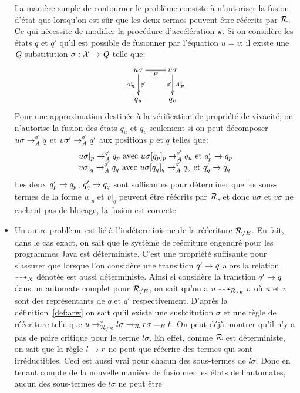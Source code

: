 \begin{itemize}
  La manière simple de contourner le problème consiste à n'autoriser la fusion d'état que lorsqu'on est
  sûr que les deux termes peuvent être réécrits par $\mathcal R$. Ce qui nécessite de modifier la procédure d'accélération
  $\mathtt{W}$. Si on considère les états $q$ et $q'$ qu'il est possible
  de fusionner par l'équation $u = v$:
  il existe une $\mathit Q$-substitution $\sigma : \mathcal X \rightarrow\mathit Q$ telle que:
   \[\xymatrix{
     u\sigma \ar@{=}[r]_{E}\ar[d]_{\aaex^i}^{\not\varepsilon} & v\sigma \ar[d]_{\not\varepsilon}^{\aaex^i}\\
     q_u & q_v
   } \]
   Pour une approximation destinée à la vérification de propriété de vivacité, on n'autorise la fusion
   des états $q_u$ et $q_v$ seulement si on peut décomposer
   $u\sigma \rightarrow^{\not\varepsilon}_\mathit A q$ et $v\sigma' \rightarrow^{\not\varepsilon}_\mathit A q'$ aux positions $p$ et $q$ telles que:
   \[\begin{array}{l}
     u\sigma|_p \rightarrow^{\not\varepsilon}_\mathit A q_p \textrm{ avec } u\sigma[q_p]_p \rightarrow^{\not\varepsilon}_\mathit A q_u \textrm{ et } q'_p \rightarrow q_p\\ 
     v\sigma|_q \rightarrow^{\not\varepsilon}_\mathit A q_q \textrm{ avec } u\sigma[q_q]_q \rightarrow^{\not\varepsilon}_\mathit A q_v \textrm{ et } q'_q \rightarrow q_q
   \end{array}\]
   Les deux $q'_p \rightarrow q_p$, $q'_q \rightarrow q_q$ sont suffisantes pour déterminer que les sous-termes de la forme $u|_p$
   et $v|_q$ peuvent être réécrits par $\mathcal R$, et donc $u\sigma$ et $v\sigma$ ne cachent pas de blocage, la fusion
   est correcte.
 \item
   Un autre problème est lié à l'indéterminisme de la réécriture ${\mathcal R_{/E}}$. En fait, dans le cas
   exact, on sait que le système de réécriture engendré pour les programmes Java est déterministe.
   C'est une propriété suffisante pour s'assurer que lorsque l'on considère une transition $q' \rightarrow q$
   alors la relation $\dashrightarrow_{\mathcal R}$ dénotée est aussi déterministe.
   Ainsi si considère la transtion $q' \rightarrow q$ dans un automate complet pour ${\mathcal R_{/E}}$, on sait
   qu'on a $u \dashrightarrow_{{\mathcal R_{/E}}} v$ où $u$ et $v$ sont des représentants de $q$ et $q'$ respectivement.
   D'après la définition~\ref{def:arw} on sait qu'il existe une susbtitution $\sigma$ et une règle
   de réécriture telle que $u \rightarrow_{{\mathcal R_{/E}}}^* l\sigma \rightarrow_\mathcal R r\sigma =_E t$. On peut déjà montrer
   qu'il n'y a pas de paire critique pour le terme $l\sigma$. En effet, comme $\mathcal R$ est déterministe,
   on sait que la règle $l\rightarrow r$ ne peut que réécrire des termes qui sont irréductibles.
   Ceci est aussi vrai pour chacun des sous-termes de $l\sigma$. Donc en tenant compte de la nouvelle
   manière de fusionner les états de l'automates, aucun des sous-termes de $l\sigma$ ne peut être

\end{itemize}
